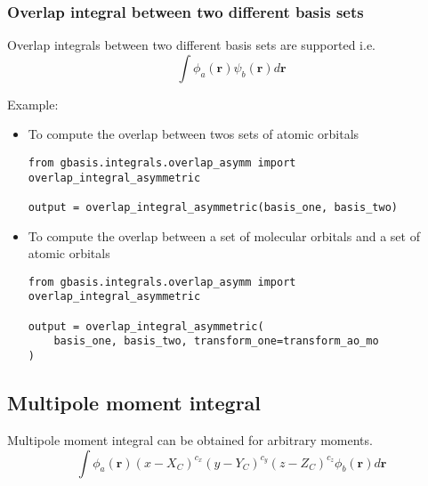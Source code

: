 \documentclass[letterpaper]{article}
\begin{document}
\subsubsection{Overlap integral between two different basis sets}
Overlap integrals between two different basis sets are supported i.e.
\begin{equation}
  \label{eq:overlap}
  \int \phi_a (\mathbf{r}) \psi_b (\mathbf{r}) d\mathbf{r}
\end{equation}

Example:
\begin{itemize}
\item To compute the overlap between twos sets of atomic orbitals
  \begin{lstlisting}[xleftmargin=-25pt]
from gbasis.integrals.overlap_asymm import overlap_integral_asymmetric

output = overlap_integral_asymmetric(basis_one, basis_two)
\end{lstlisting}
\item To compute the overlap between a set of molecular orbitals and a set of
  atomic orbitals
\begin{lstlisting}[xleftmargin=-25pt]
from gbasis.integrals.overlap_asymm import overlap_integral_asymmetric

output = overlap_integral_asymmetric(
    basis_one, basis_two, transform_one=transform_ao_mo
)
\end{lstlisting}
\end{itemize}
\subsection{Multipole moment integral}
Multipole moment integral can be obtained for arbitrary moments.
\begin{equation}
  \label{eq:multipole}
  \int \phi_a (\mathbf{r}) (x - X_C)^{c_x} (y - Y_C)^{c_y} (z - Z_C)^{c_z} \phi_b (\mathbf{r}) d\mathbf{r}
\end{equation}
\end{document}
